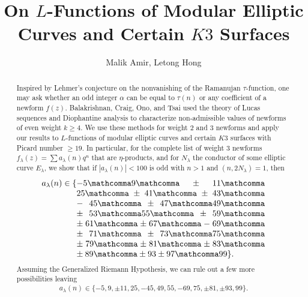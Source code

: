\documentclass[12pt]{amsart}
\newcommand{\numberlist}[2][0.8\linewidth]{%
  \{\parbox[t]{#1}{\printcommalist{#2}}%
  }
\newcommand{\printcommalist}[1]{%
  \begingroup\lccode`~=`,\lowercase{\endgroup\def~}{\mathcomma\penalty0 }%
  \mathcode`,="8000
  \thinmuskip=6mu plus 6mu minus 2mu
  $#1\}.$
}
\numberwithin{equation}{section}
\begin{document}
\title{On $L$-Functions of Modular Elliptic Curves and Certain $K3$ Surfaces}
\author{Malik Amir, Letong Hong}
\address{Department of Mathematics, École Polytechnique Fédérale de Lausanne}
\address{Department of Mathematics, Massachusetts Institute of Technology}

\begin{abstract} 
Inspired by Lehmer's conjecture on the nonvanishing of the Ramanujan $\tau$-function, one may ask whether an odd integer $\alpha$ can be equal to $\tau(n)$ or any coefficient of a newform $f(z)$. Balakrishnan, Craig, Ono, and Tsai used the theory of Lucas sequences and Diophantine analysis to characterize non-admissible values of newforms of even weight $k\geq 4$. We use these methods for weight $2$ and $3$ newforms and apply our results to $L$-functions of modular elliptic curves and certain $K3$ surfaces with Picard number $\ge 19$. In particular, for the complete list of weight $3$ newforms $f_\lambda(z)=\sum a_\lambda(n)q^n$ that are $\eta$-products, and for $N_\lambda$ the conductor of some elliptic curve $E_\lambda$, we show that if $|a_\lambda(n)|<100$ is odd with $n>1$ and $(n,2N_\lambda)=1$, then
\begin{align*}
a_\lambda(n) \in \numberlist[.65\linewidth]{-5,9,\pm 11,25, \pm41, \pm 43, -45,\pm47,49, \pm53,55, \pm59, \pm61, \pm 67, -69,\pm 71, \pm 73,75, \pm79,\pm81, \pm 83, \pm89,\pm 93 \pm 97, 99}
\end{align*}
Assuming the Generalized Riemann Hypothesis, we can rule out a few more possibilities leaving 
\begin{align*}
a_\lambda(n) \in \{-5,9,\pm 11,25,-45,49,55,-69,75,\pm 81,\pm 93, 99\}.
\end{align*}

\end{abstract}

\maketitle
\end{document}
